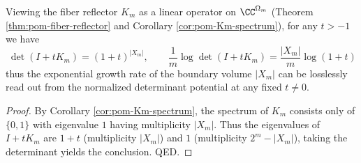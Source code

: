 \begin{corollary}[Determinant Potential of the Fiber Reflector: \texorpdfstring{$\det(I+tK_m)=(1+t)^{|X_m|}$}{det(I+tK)=(1+t)^|X|}]\label{cor:op-algebra-fiber-reflector-determinant-potential}
Viewing the fiber reflector \(K_m\) as a linear operator on \(\CC^{\Omega_m}\) (Theorem \ref{thm:pom-fiber-reflector} and Corollary \ref{cor:pom-Km-spectrum}), for any \(t>-1\) we have
\[
\boxed{\;
\det(I+tK_m)=(1+t)^{|X_m|},\qquad
\frac{1}{m}\log\det(I+tK_m)=\frac{|X_m|}{m}\log(1+t)\;}
\]
thus the exponential growth rate of the boundary volume \(|X_m|\) can be losslessly read out from the normalized determinant potential at any fixed \(t\neq 0\).
\end{corollary}
\begin{proof}
By Corollary \ref{cor:pom-Km-spectrum}, the spectrum of \(K_m\) consists only of \(\{0,1\}\) with eigenvalue \(1\) having multiplicity \(|X_m|\).
Thus the eigenvalues of \(I+tK_m\) are \(1+t\) (multiplicity \(|X_m|\)) and \(1\) (multiplicity \(2^m-|X_m|\)), taking the determinant yields the conclusion. QED.
\end{proof}

